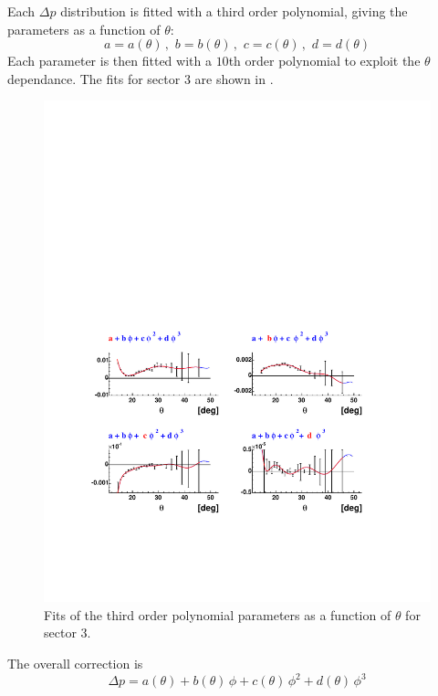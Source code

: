Each $\Delta p$ distribution is fitted with a third order polynomial, giving the parameters as a function of $\theta$:
\begin{equation}
a = a(\theta)\, , \,\, 
b = b(\theta)\, , \,\,  
c = c(\theta)\, , \,\,  
d = d(\theta)
\label{eqn:mom_pars}
\end{equation}
Each parameter is then fitted with a $10$th order polynomial to exploit the $\theta$ dependance.
The fits for sector 3 are shown in .
\begin{figure}[h]
 \begin{center}
 \includegraphics[width = 12cm, bb=60 130 540 450]{data_reduction/kine_corr/img/PART_m}
  \caption[Fits of the third order polynomial parameters as a function of $\theta$ for sector 3]
          { Fits of the third order polynomial parameters as a function of $\theta$ for sector 3.}
 \label{fig:corr_e_par_fits}
 \end{center}
\end{figure}

The overall correction is
$$
\Delta p = a(\theta) + b(\theta)\,\phi + c(\theta)\,\phi^2 + d(\theta)\,\phi^3
$$


